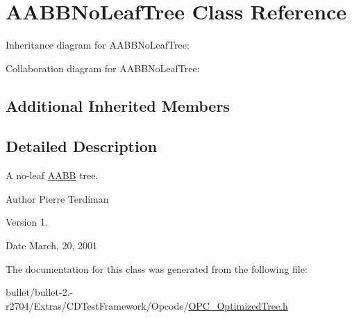 \hypertarget{class_a_a_b_b_no_leaf_tree}{\section{A\+A\+B\+B\+No\+Leaf\+Tree Class Reference}
\label{class_a_a_b_b_no_leaf_tree}
}


Inheritance diagram for A\+A\+B\+B\+No\+Leaf\+Tree\+:


Collaboration diagram for A\+A\+B\+B\+No\+Leaf\+Tree\+:
\subsection*{Additional Inherited Members}


\subsection{Detailed Description}
A no-\/leaf \hyperlink{class_a_a_b_b}{A\+A\+B\+B} tree.

\begin{DoxyAuthor}{Author}
Pierre Terdiman 
\end{DoxyAuthor}
\begin{DoxyVersion}{Version}
1. 
\end{DoxyVersion}
\begin{DoxyDate}{Date}
March, 20, 2001 
\end{DoxyDate}


The documentation for this class was generated from the following file\+:\begin{DoxyCompactItemize}
\item 
bullet/bullet-\/2.-\/r2704/\+Extras/\+C\+D\+Test\+Framework/\+Opcode/\hyperlink{_o_p_c___optimized_tree_8h}{O\+P\+C\+\_\+\+Optimized\+Tree.\+h}\end{DoxyCompactItemize}
